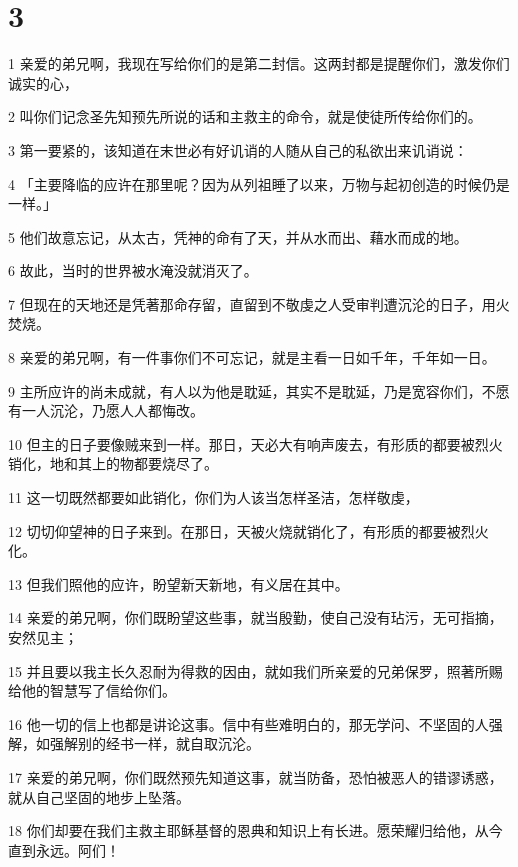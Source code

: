 \chapter{3}

\par 1 亲爱的弟兄啊，我现在写给你们的是第二封信。这两封都是提醒你们，激发你们诚实的心，
\par 2 叫你们记念圣先知预先所说的话和主救主的命令，就是使徒所传给你们的。
\par 3 第一要紧的，该知道在末世必有好讥诮的人随从自己的私欲出来讥诮说：
\par 4 「主要降临的应许在那里呢？因为从列祖睡了以来，万物与起初创造的时候仍是一样。」
\par 5 他们故意忘记，从太古，凭神的命有了天，并从水而出、藉水而成的地。
\par 6 故此，当时的世界被水淹没就消灭了。
\par 7 但现在的天地还是凭著那命存留，直留到不敬虔之人受审判遭沉沦的日子，用火焚烧。
\par 8 亲爱的弟兄啊，有一件事你们不可忘记，就是主看一日如千年，千年如一日。
\par 9 主所应许的尚未成就，有人以为他是耽延，其实不是耽延，乃是宽容你们，不愿有一人沉沦，乃愿人人都悔改。
\par 10 但主的日子要像贼来到一样。那日，天必大有响声废去，有形质的都要被烈火销化，地和其上的物都要烧尽了。
\par 11 这一切既然都要如此销化，你们为人该当怎样圣洁，怎样敬虔，
\par 12 切切仰望神的日子来到。在那日，天被火烧就销化了，有形质的都要被烈火　化。
\par 13 但我们照他的应许，盼望新天新地，有义居在其中。
\par 14 亲爱的弟兄啊，你们既盼望这些事，就当殷勤，使自己没有玷污，无可指摘，安然见主；
\par 15 并且要以我主长久忍耐为得救的因由，就如我们所亲爱的兄弟保罗，照著所赐给他的智慧写了信给你们。
\par 16 他一切的信上也都是讲论这事。信中有些难明白的，那无学问、不坚固的人强解，如强解别的经书一样，就自取沉沦。
\par 17 亲爱的弟兄啊，你们既然预先知道这事，就当防备，恐怕被恶人的错谬诱惑，就从自己坚固的地步上坠落。
\par 18 你们却要在我们主救主耶稣基督的恩典和知识上有长进。愿荣耀归给他，从今直到永远。阿们！


